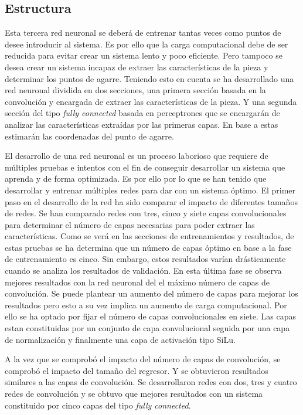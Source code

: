 \subsection{Estructura}
\label{chap:Sistema de visión artificial subsec:Regresor Estructura}
Esta tercera red neuronal se deberá de entrenar tantas veces como puntos de desee introducir al sistema. Es por ello que la carga computacional debe de ser reducida para evitar crear un sistema lento y poco eficiente. Pero tampoco se desea crear un sistema incapaz de extraer las características de la pieza y determinar los puntos de agarre. Teniendo esto en cuenta se ha desarrollado una red neuronal dividida en dos secciones, una primera sección basada en la convolución y encargada de extraer las características de la pieza. Y una segunda sección del tipo \textit{fully connected} basada en perceptrones que se encargarán de analizar las características extraídas por las primeras capas. En base a estas estimarán las coordenadas del punto de agarre.

El desarrollo de una red neuronal es un proceso laborioso que requiere de múltiples pruebas e intentos con el fin de conseguir desarrollar un sistema que aprenda y de forma optimizada. Es por ello por lo que se han tenido que desarrollar y entrenar múltiples redes para dar con un sistema óptimo. El primer paso en el desarrollo de la red ha sido comparar el impacto de diferentes tamaños de redes. Se han comparado redes con tres, cinco y siete capas convolucionales para determinar el número de capas necesarias para poder extraer las características. Como se verá en las secciones de entrenamientos y resultados, de estas pruebas se ha determina que un número de capas óptimo en base a la fase de entrenamiento es cinco. Sin embargo, estos resultados varían drásticamente cuando se analiza los resultados de validación. En esta última fase se observa mejores resultados con la red neuronal del el máximo número de capas de convolución. Se puede plantear un aumento del número de capas para mejorar los resultados pero esto a su vez implica un aumento de carga computacional. Por ello se ha optado por fijar el número de capas convolucionales en siete. Las capas estan constituidas por un conjunto de capa convolucional seguida por una capa de normalización y finalmente una capa de activación tipo SiLu.

A la vez que se comprobó el impacto del número de capas de convolución, se comprobó el impacto del tamaño del regresor. Y se obtuvieron resultados similares a las capas de convolución. Se desarrollaron redes con dos, tres y cuatro redes de convolución y se obtuvo que mejores resultados con un sistema constituido por cinco capas del tipo \textit{fully connected}.

